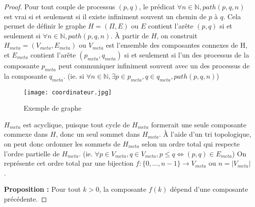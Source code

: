 \documentclass{article}
\begin{document}
\begin{proof}

	Pour tout couple de processus $(p, q)$, le prédicat $\forall n \in \mathds{N}, path(p, q, n)$ est vrai si et seulement si il existe infiniment souvent un chemin de $p$ à $q$.
	Cela permet de définir le graphe $H = (\Pi, E)$ ou $E$ contient l'arête $(p,q)$ si et seulement si $\forall n \in \mathds{N}, path(p, q, n)$.
	À partir de $H$, on construit $H_{meta} = (V_{meta}, E_{meta})$ ou $V_{meta}$ est l'ensemble des composantes connexes de H, et $E_{meta}$ contient l'arête $(p_{meta}, q_{meta})$
	si et seulement si l'un des processus de la composante $p_{meta}$ peut communiquer infiniment souvent avec un des processus de la composante $q_{meta}$.
	(ie. si $\forall n \in \mathds{N}, \exists p \in p_{meta}, q \in q_{meta}, path(p,q,n)$)

	\begin{figure}[ht!]
		\centering
		\texttt{[image: coordinateur.jpg]}
		\caption{Exemple de graphe}
	\end{figure}

	$H_{meta}$ est acyclique, puisque tout cycle de $H_{meta}$ formerait une seule composante commexe dans $H$, donc un seul sommet dans $H_{meta}$.
	À l'aide d'un tri topologique, on peut donc ordonner les sommets de $H_{meta}$ selon un ordre total qui respecte l'ordre partielle de $H_{meta}$.
	(ie. $\forall p \in V_{meta}, q \in V_{meta}, p \leq q \Leftrightarrow (p,q) \in E_{meta}$)
	On représente cet ordre total par une bijection $f : \{0, ..., n-1\} \rightarrow V_{meta}$ ou $n = |V_{meta}|$.

	\textbf{Proposition :} Pour tout $k > 0$, la composante $f(k)$ dépend d'une composante précédente.


\end{proof}
\end{document}

